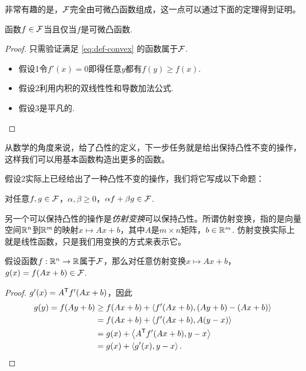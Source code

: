 非常有趣的是，$\mathcal{F}$完全由可微凸函数组成，这一点可以通过下面的定理得到证明。

\begin{theorem}
    函数$f\in\mathcal{F}$当且仅当$f$是可微凸函数.
\end{theorem}   
\begin{proof}
只需验证满足 \eqref{eq:def-convex} 的函数属于$\mathcal{F}$.
    \begin{itemize}
        \item 假设1令$f'(x)=0$即得任意$y$都有$f(y)\geq f(x)$.
        \item 假设2利用内积的双线性性和导数加法公式.
        \item 假设3是平凡的.
    \end{itemize}
\end{proof}



从数学的角度来说，给了凸性的定义，下一步任务就是给出保持凸性不变的操作，这样我们可以用基本函数构造出更多的函数。

假设2实际上已经给出了一种凸性不变的操作，我们将它写成以下命题：
\begin{proposition}\label{prop:nonnegative-combination}
对任意$f,g\in\mathcal{F}$，$\alpha,\beta\geq 0$，$\alpha f+\beta g\in\mathcal{F}$.
\end{proposition}

另一个可以保持凸性的操作是\emph{仿射变换}可以保持凸性。所谓仿射变换，指的是向量空间$\mathbb{R}^n$到$\mathbb{R}^m$的映射$x\mapsto Ax+b$，其中$A$是$m\times n$矩阵，$b\in\mathbb{R}^m$. 仿射变换实际上就是线性函数，只是我们用变换的方式来表示它。

\begin{proposition}\label{prop:affine-transformation}
假设函数$f:\mathbb{R}^n\to\mathbb{R}$属于$\mathcal{F}$，那么对任意仿射变换$x\mapsto Ax+b$，$g(x)=f(Ax+b)\in\mathcal{F}$.
\end{proposition}
\begin{proof}
    $g'(x)=A^{\mathsf{T}} f'(Ax+b)$，因此
    \begin{align*}
        g(y)=f(Ay+b)&\geq f(Ax+b)+\left\langle{f'(Ax+b)},{(Ay+b)-(Ax+b)}\right\rangle\\
        &=f(Ax+b)+\left\langle{f'(Ax+b)},{A(y-x)}\right\rangle\\
        &=g(x)+\left\langle{A^{\mathsf{T}}f'(Ax+b)},{y-x}\right\rangle\\
        &=g(x)+\left\langle{g'(x)},{y-x}\right\rangle.
    \end{align*}
\end{proof}

